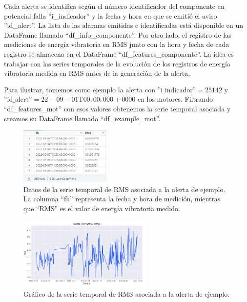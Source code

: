\documentclass{article}[14pts]
\begin{document}
    Cada alerta se identifica según el número identificador del componente en potencial falla ''i\_indicador'' y la fecha y hora en que se emitió el aviso ''id\_alert''. La lista de las alarmas emitidas e identificadas está disponible en un DataFrame llamado ``df\_info\_componente''.  Por otro lado, el registro de las mediciones de energía vibratoria en RMS junto con la hora y fecha de cada registro se almacena en el DataFrame ``df\_features\_componente''. La idea es trabajar con las series temporales de la evolución de los registros de energía vibratoria medida en RMS antes de la generación de la alerta.

    Para ilustrar,  tomemos como ejemplo la alerta con $\text{''i\_indicador''}= 25142$ y $\text{''id\_alert''} = 22-09-01\text{T}00:00:000+0000$ en los motores. Filtrando ``df\_features\_mot'' con esos valores obtenemos la serie temporal asociada y creamos su DataFrame llamado ``df\_example\_mot''.

      \begin{center}
        \begin{figure}[h]
          \centering
          \includegraphics[width=0.4\textwidth]{images/3.png}
          \caption{Datos de la serie temporal de RMS asociada a la alerta de ejemplo. La columna ``fh'' representa la fecha y hora de medición, mientras que ``RMS'' es el valor de energía vibratoria medido.}
        \end{figure}    
      \end{center}

      \begin{center}
        \begin{figure}[h]
          \centering
          \includegraphics[width=0.6\textwidth]{images/4.png}
          \caption{Gráfico de la serie temporal de RMS asociada a la alerta de ejemplo.}
        \end{figure}    
      \end{center}
      
\end{document}
